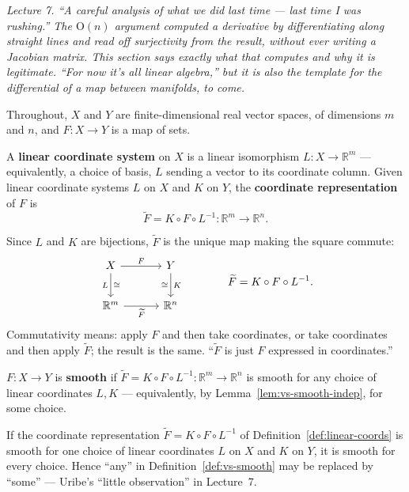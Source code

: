 \documentclass[11pt]{report}
\makeatletter
\newcounter{defcounter}[section]
\newcounter{thmcounter}[section]
\newcommand{\thmlabel}[1]{\edef\@currentlabel{\arabic{section}.\arabic{thmcounter}}\label{#1}}
\newcommand{\deflabel}[1]{\edef\@currentlabel{\arabic{section}.\arabic{defcounter}}\label{#1}}
\newcommand{\Ogp}{\mathrm{O}}
\newcommand{\leeref}[1]{\par\smallskip{\raggedleft\footnotesize\textsc{Lee}:\ #1\par}}
\makeatother
\begin{document}
\textit{Lecture 7. ``A careful analysis of what we did last time --- last time I was rushing.'' The $\Ogp(n)$ argument computed a derivative by differentiating along straight lines and read off surjectivity from the result, without ever writing a Jacobian matrix. This section says exactly what that computes and why it is legitimate. ``For now it's all linear algebra,'' but it is also the template for the differential of a map between manifolds, to come.}

Throughout, $X$ and $Y$ are finite-dimensional real vector spaces, of dimensions $m$ and $n$, and $F : X \to Y$ is a map of sets.

\begin{defbox}\deflabel{def:linear-coords}
A \textbf{linear coordinate system} on $X$ is a linear isomorphism $L : X \to \mathbb{R}^m$ --- equivalently, a choice of basis, $L$ sending a vector to its coordinate column. Given linear coordinate systems $L$ on $X$ and $K$ on $Y$, the \textbf{coordinate representation} of $F$ is
\[
\widetilde F = K \circ F \circ L^{-1} : \mathbb{R}^m \to \mathbb{R}^n .
\]
\leeref{Example 1.24}
\end{defbox}

Since $L$ and $K$ are bijections, $\widetilde F$ is the unique map making the square commute:
\[
\begin{tikzcd}[row sep=2.2em, column sep=3.2em]
X \arrow[r, "F"] \arrow[d, "L"', "\cong"] & Y \arrow[d, "K", "\cong"'] \\
\mathbb{R}^m \arrow[r, "\widetilde F"'] & \mathbb{R}^n
\end{tikzcd}
\qquad\qquad \widetilde F = K \circ F \circ L^{-1}.
\]
Commutativity means: apply $F$ and then take coordinates, or take coordinates and then apply $\widetilde F$; the result is the same. ``$\widetilde F$ is just $F$ expressed in coordinates.''

\begin{defbox}\deflabel{def:vs-smooth}
$F : X \to Y$ is \textbf{smooth} if $\widetilde F = K \circ F \circ L^{-1} : \mathbb{R}^m \to \mathbb{R}^n$ is smooth for any choice of linear coordinates $L, K$ --- equivalently, by Lemma~\ref{lem:vs-smooth-indep}, for some choice.
\end{defbox}

\begin{lembox}\thmlabel{lem:vs-smooth-indep}
If the coordinate representation $\widetilde F = K \circ F \circ L^{-1}$ of Definition~\ref{def:linear-coords} is smooth for one choice of linear coordinates $L$ on $X$ and $K$ on $Y$, it is smooth for every choice. Hence ``any'' in Definition~\ref{def:vs-smooth} may be replaced by ``some'' --- Uribe's ``little observation'' in Lecture~7.
\end{lembox}
\end{document}
